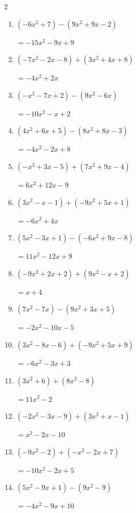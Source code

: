 \begin{multicols}{2}
\begin{enumerate}
  \item $(-6x^{2}+7)-(9x^{2}+9x-2)$

        $=-15x^{2}-9x+9$

  \item $(-7x^{2}-2x-8)+(3x^{2}+4x+8)$

        $=-4x^{2}+2x$

\columnbreak %

\resetques

  \item $(-x^{2}-7x+2)-(9x^{2}-6x)$

        $=-10x^{2}-x+2$

  \item $(4x^{2}+6x+5)-(8x^{2}+8x-3)$

        $=-4x^{2}-2x+8$

  \item $(-x^{2}+3x-5)+(7x^{2}+9x-4)$

        $=6x^{2}+12x-9$

  \item $(3x^{2}-x-1)+(-9x^{2}+5x+1)$

        $=-6x^{2}+4x$

  \item $(5x^{2}-3x+1)-(-6x^{2}+9x-8)$

        $=11x^{2}-12x+9$

  \item $(-9x^{2}+2x+2)+(9x^{2}-x+2)$

        $=x+4$

  \item $(7x^{2}-7x)-(9x^{2}+3x+5)$

        $=-2x^{2}-10x-5$

  \item $(3x^{2}-8x-6)+(-9x^{2}+5x+9)$

        $=-6x^{2}-3x+3$

  \item $(3x^{2}+6)+(8x^{2}-8)$

        $=11x^{2}-2$

  \item $(-2x^{2}-3x-9)+(3x^{2}+x-1)$

        $=x^{2}-2x-10$

  \item $(-9x^{2}-2)+(-x^{2}-2x+7)$

        $=-10x^{2}-2x+5$

  \item $(5x^{2}-9x+1)-(9x^{2}-9)$

        $=-4x^{2}-9x+10$


\end{enumerate}
\end{multicols}
